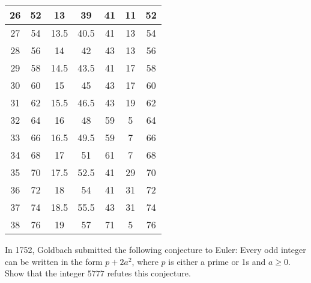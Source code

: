 \begin{solution}
\begin{center}
\begin{tabular}{ |c|c|c|c|c|c|c| }
        \hline
        26 & 52 & 13 & 39 & 41 & 11 & 52 \\
        \hline
        27 & 54 & 13.5 & 40.5 & 41 & 13 & 54 \\
        \hline
        28 & 56 & 14 & 42 & 43 & 13 & 56\\
        \hline
        29 & 58 & 14.5 & 43.5 & 41 & 17 & 58 \\
        \hline
        30 & 60 & 15 & 45 & 43 & 17 & 60 \\
        \hline
        31 & 62 & 15.5 & 46.5 & 43 & 19 & 62 \\
        \hline
        32 & 64 & 16 & 48 & 59 & 5 & 64 \\
        \hline
        33 & 66 & 16.5 & 49.5 & 59 & 7 & 66 \\
        \hline
        34 & 68 & 17 & 51 & 61 & 7 & 68 \\
        \hline
        35 & 70 & 17.5 & 52.5 & 41 & 29 & 70 \\
        \hline
        36 & 72 & 18 & 54 & 41 & 31 & 72 \\
        \hline
        37 & 74 & 18.5 & 55.5 & 43 & 31 & 74 \\
        \hline
        38 & 76 & 19 & 57 & 71 & 5 & 76 \\
        \hline
    \end{tabular}
    \end{center}
\end{solution}

\begin{exercise}
    In 1752, Goldbach submitted the following conjecture to Euler: Every odd integer can be written in the form $p + 2a^2$, where $p$ is either a prime or 1s and $a \geq 0$. Show that the integer $5777$ refutes this conjecture. \\
\end{exercise}

